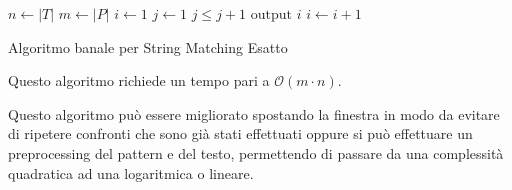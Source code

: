 \begin{algorithm}
    \begin{algorithmic}
        \State $n\gets |T|$
        \State $m \gets |P|$
        \State $i\gets 1$
        \State $j \gets 1$
        \State $j \leq j + 1$
        \EndWhile
        \State $\text{output } i$
        \EndIf
        \State $i \gets i + 1$
        \EndWhile
        \EndFunction
    \end{algorithmic}
    \caption{Algoritmo banale per String Matching Esatto}
\end{algorithm}
Questo algoritmo richiede un tempo pari a $\mathcal{O}(m \cdot n)$.
\begin{nota}
    Questo algoritmo può essere migliorato spostando la finestra in modo da 
    evitare di ripetere confronti che sono già stati effettuati oppure si può 
    effettuare un preprocessing del pattern e del testo, permettendo di passare 
    da una complessità quadratica ad una logaritmica o lineare.
\end{nota}
